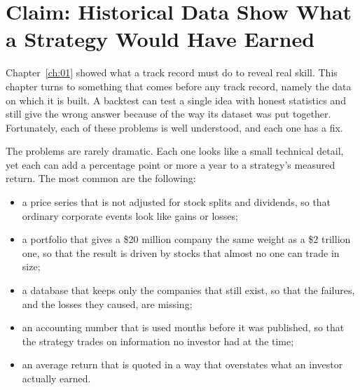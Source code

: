 \makeatletter
{}
\makeatother

\chapter{Claim: Historical Data Show What a Strategy Would Have Earned}
\label{ch:02}

Chapter~\ref{ch:01} showed what a track record must do to reveal real skill. This chapter turns to something that comes before any track record, namely the data on which it is built. A backtest can test a single idea with honest statistics and still give the wrong answer because of the way its dataset was put together. Fortunately, each of these problems is well understood, and each one has a fix.

The problems are rarely dramatic. Each one looks like a small technical detail, yet each can add a percentage point or more a year to a strategy's measured return. The most common are the following:

\begin{itemize}
  \item a price series that is not adjusted for stock splits and dividends, so that ordinary corporate events look like gains or losses;
  \item a portfolio that gives a \$20 million company the same weight as a \$2 trillion one, so that the result is driven by stocks that almost no one can trade in size;
  \item a database that keeps only the companies that still exist, so that the failures, and the losses they caused, are missing;
  \item an accounting number that is used months before it was published, so that the strategy trades on information no investor had at the time;
  \item an average return that is quoted in a way that overstates what an investor actually earned.
\end{itemize}

